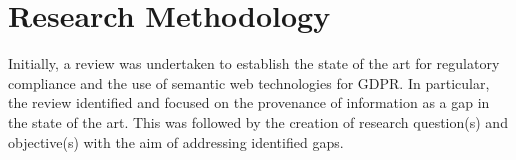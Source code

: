 
\section{Research Methodology}
Initially, a review was undertaken to establish the state of the art for regulatory compliance and the use of semantic web technologies for GDPR. In particular, the review identified and focused on the provenance of information as a gap in the state of the art. This was followed by the creation of research question(s) and objective(s) with the aim of addressing identified gaps.

